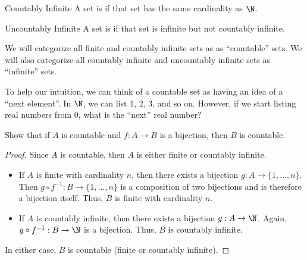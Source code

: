 \documentclass[letterpaper,12pt]{report}
\begin{document}
\begin{dfnbox}{Countably Infinite}{}
    A set is  if that set has the same cardinality as $\N$.
\end{dfnbox}

\begin{dfnbox}{Uncountably Infinite}{}
    A set is  if that set is infinite but not countably infinite.
\end{dfnbox}

We will categorize all finite and countably infinite sets as as ``countable'' sets. We will also categorize all countably infinite and uncountably infinite sets as ``infinite'' sets.

To help our intuition, we can think of a countable set as having an idea of a ``next element''. In $\N$, we can list 1, 2, 3, and so on. However, if we start listing real numbers from $0$, what is the ``next'' real number?

\begin{exbox}{}{}
    Show that if $A$ is countable and $f : A \to B$ is a bijection, then $B$ is countable.
    \tcblower
    \begin{proof}
        Since $A$ is countable, then $A$ is either finite or countably infinite.
        \begin{itemize}
            \item If $A$ is finite with cardinality $n$, then there exists a bijection $g : A \to \{1, \ldots, n\}$. Then $g \circ f^{-1} : B \to \{1, \ldots, n\}$ is a composition of two bijections and is therefore a bijection itself. Thus, $B$ is finite with cardinality $n$.
            \item If $A$ is countably infinite, then there exists a bijection $g : A \to \N$. Again, $g \circ f^{-1} : B \to \N$ is a bijection. Thus, $B$ is countably infinite.
        \end{itemize}
        In either case, $B$ is countable (finite or countably infinite).
    \end{proof}
\end{exbox}
\end{document}
